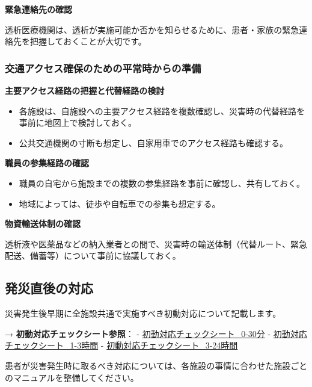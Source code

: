 \documentclass[
  japanese,
  letterpaper,
  DIV=11,
  numbers=noendperiod]{scrartcl}
\providecommand{\tightlist}{%
  \setlength{\itemsep}{0pt}\setlength{\parskip}{0pt}}
\begin{document}
\textbf{緊急連絡先の確認}

透析医療機関は、透析が実施可能か否かを知らせるために、患者・家族の緊急連絡先を把握しておくことが大切です。

\subsubsection{交通アクセス確保のための平常時からの準備}\label{ux4ea4ux901aux30a2ux30afux30bbux30b9ux78baux4fddux306eux305fux3081ux306eux5e73ux5e38ux6642ux304bux3089ux306eux6e96ux5099}

\textbf{主要アクセス経路の把握と代替経路の検討}

\begin{itemize}
\tightlist
\item
  各施設は、自施設への主要アクセス経路を複数確認し、災害時の代替経路を事前に地図上で検討しておく。
\item
  公共交通機関の寸断も想定し、自家用車でのアクセス経路も確認する。
\end{itemize}

\textbf{職員の参集経路の確認}

\begin{itemize}
\tightlist
\item
  職員の自宅から施設までの複数の参集経路を事前に確認し、共有しておく。
\item
  地域によっては、徒歩や自転車での参集も想定する。
\end{itemize}

\textbf{物資輸送体制の確認}

透析液や医薬品などの納入業者との間で、災害時の輸送体制（代替ルート、緊急配送、備蓄等）について事前に協議しておく。

\subsection{発災直後の対応}\label{ux767aux707dux76f4ux5f8cux306eux5bfeux5fdc}

災害発生後早期に全施設共通で実施すべき初動対応について記載します。

→ \textbf{初動対応チェックシート参照}： -
\href{1410_初動対応チェックシート_0-30分.qmd}{初動対応チェックシート\_0-30分}
-
\href{1420_初動対応チェックシート_1-3時間.qmd}{初動対応チェックシート\_1-3時間}
-
\href{1430_初動対応チェックシート_3-24時間.qmd}{初動対応チェックシート\_3-24時間}

患者が災害発生時に取るべき対応については、各施設の事情に合わせた施設ごとのマニュアルを整備してください。
\end{document}
